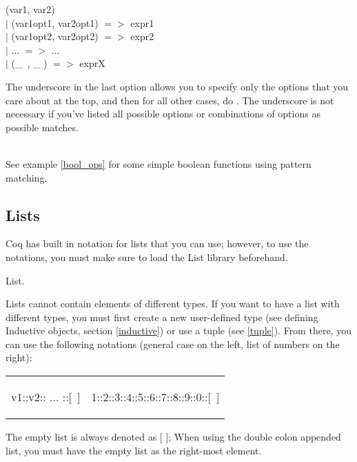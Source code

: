 \begin{code}
	\match (var1, var2) \with 					\\
	$\mid$ (var1opt1, var2opt1) $=>$ expr1		\\
	$\mid$ (var1opt2, var2opt2) $=>$ expr2		\\
	$\mid$ ...	$=>$ ...						\\
	$\mid$ (\_\ , \_ ) $=>$ exprX				\\
	\End
\end{code}

\noindent
The underscore in the last option allows you to specify only the options that you care about at the top, and then for all other cases, do . The underscore is not necessary if you've listed all possible options or combinations of options as possible matches.

~\\ \noindent
See example \ref{bool_ops} for some simple boolean functions using pattern matching.





\subsection{Lists} \label{subsec: list} 
Coq has built in notation for lists that you can use; however, to use the notations, you must make sure to load the List library beforehand. 
\begin{code}
	\Load List.
\end{code}


\noindent
Lists cannot contain elements of different types. 
If you want to have a list with different types, you must first create a new user-defined type (see defining Inductive objects, section \ref{inductive}) or use a tuple (see \ref{tuple}).
From there, you can use the following notations (general case on the left, list of numbers on the right):
\hspace{-1cm}
\begin{tabular}{p{8cm} p{8cm}}
\begin{code}
	v1::v2:: ... ::[\ ]
\end{code}
\begin{code}
	[ v1; ...; vN ]
\end{code}
&
\begin{code}
	1::2::3::4::5::6::7::8::9::0::[\ ]
\end{code}
\begin{code}
	[ 1; 2; 3; 4; 5; 6; 7; 8; 9; 0 ]
\end{code} 
\end{tabular}
The empty list is always denoted as [ ]; When using the double colon appended list, you must have the empty list as the right-most element.


